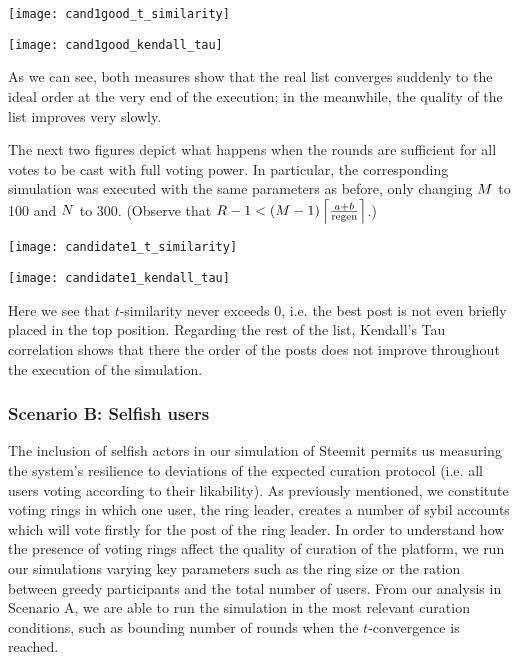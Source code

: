       \texttt{[image: cand1good\_t\_similarity]}

      \texttt{[image: cand1good\_kendall\_tau]}

      As we can see, both measures show that the real list converges suddenly to
      the ideal order at the very end of the execution; in the meanwhile, the
      quality of the list improves very slowly.

      The next two figures depict what happens when the rounds are sufficient
      for all votes to be cast with full voting power. In particular, the
      corresponding simulation was executed with the same parameters as before,
      only changing $\postlen$ to 100 and $\playerlen$ to 300. (Observe that
      $\rounds - 1 < \left(\postlen - 1\right)\ceil*{\frac{a + b}{\regen}}$.)

      \texttt{[image: candidate1\_t\_similarity]}

      \texttt{[image: candidate1\_kendall\_tau]}

      Here we see that $t$-similarity never exceeds 0, i.e. the best post is not
      even briefly placed in the top position. Regarding the rest of the list,
      Kendall's Tau correlation shows that there the order of the posts does not
      improve throughout the execution of the simulation.

    \subsubsection{Scenario B: Selfish users}
      The inclusion of selfish actors in our simulation of Steemit permits us
      measuring the system's resilience to deviations of the expected curation
      protocol (i.e. all users voting according to their likability). As
      previously mentioned, we constitute voting rings in which one user, the
      ring leader, creates a number of sybil accounts which will vote firstly
      for the post of the ring leader. In order to understand how the presence
      of voting rings affect the quality of curation of the platform, we run our
      simulations varying key parameters such as the ring size or the ration
      between greedy participants and the total number of users. From our
      analysis in Scenario A, we are able to run the simulation in the most
      relevant curation conditions, such as bounding number of rounds when the
      $t$-convergence is reached.

